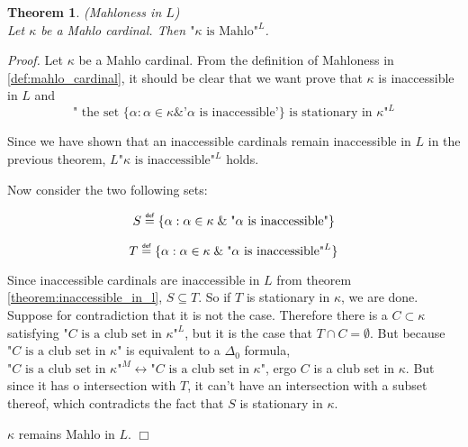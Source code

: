 \documentclass[12pt,a4paper]{article}
\newtheorem{theorem}{Theorem}[section]
\newenvironment{proof}
{\noindent \textit{Proof.}}
{\hspace*{\fill} $\Box$}
\renewcommand{\iff}{\leftrightarrow}
\newcommand{\bce}{\begin{compactenum}}
\newcommand{\ece}{\end{compactenum}}
\newcommand{\et}{\mathrel{\&}}
\newcommand\defeq{\mathrel{\overset{\makebox[0pt]{\mbox{\normalfont\tiny\sffamily def}}}{=}}}
\begin{document}
\begin{theorem}{(Mahloness in $L$)}\label{theorem:mahlo_in_l}\\
Let $\kappa$ be a Mahlo cardinal. Then $\mbox{"$\kappa$ is Mahlo"}^L$.
\end{theorem}

\begin{proof}
Let $\kappa$ be a Mahlo cardinal. From the definition of Mahloness in \ref{def:mahlo_cardinal}, it should be clear that we want prove that $\kappa$ is inaccessible in $L$ and 
\begin{equation}
\mbox{" the set }\{\alpha : \alpha \in \kappa \et \mbox{'$\alpha$ is inaccessible'}\}\mbox{ is stationary in $\kappa$"}^L
\end{equation}

Since we have shown that an inaccessible cardinals remain inaccessible in $L$ in the previous theorem, $L\mbox{"$\kappa$ is inaccessible"}^L$ holds.

Now consider the two following sets:
\bce[(i)]
\item \begin{equation}
S \defeq \{\alpha : \alpha \in \kappa \et \mbox{"$\alpha$ is inaccessible"}\}
\end{equation}
\item \begin{equation}
T \defeq \{\alpha : \alpha \in \kappa \et \mbox{"$\alpha$ is inaccessible"}^L\}
\end{equation} 
\ece 
Since inaccessible cardinals are inaccessible in $L$ from theorem \ref{theorem:inaccessible_in_l}, $S \subseteq T$.
So if $T$ is stationary in $\kappa$, we are done. Suppose for contradiction that it is not the case. 
Therefore there is a $C \subset \kappa$ satisfying $\mbox{"$C$ is a club set in $\kappa$"}^L$, but it is the case that $T \cap C = \emptyset$.
But because $\mbox{"$C$ is a club set in $\kappa$"}$ is equivalent to a $\Delta_0$ formula, $\mbox{"$C$ is a club set in $\kappa$"}^M \iff \mbox{"$C$ is a club set in $\kappa$"}$, ergo $C$ is a club set in $\kappa$. But since it has o intersection with $T$, it can't have an intersection with a subset thereof, which contradicts the fact that $S$ is stationary in $\kappa$.

$\kappa$ remains Mahlo in $L$.
\end{proof}

\end{document}
